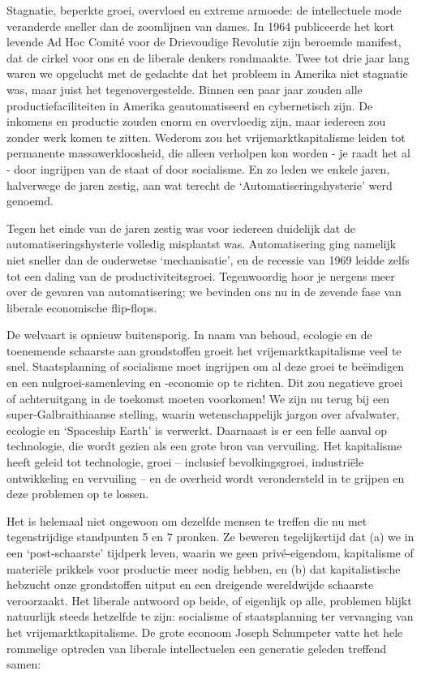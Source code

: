 \documentclass[
  a5paper,
  smalldemyvopaper,10pt,twoside,onecolumn,openright,extrafontsizes,hidelinks]{memoir}
\begin{document}
Stagnatie, beperkte groei, overvloed en extreme armoede: de
intellectuele mode veranderde sneller dan de zoomlijnen van dames. In
1964 publiceerde het kort levende Ad Hoc Comité voor de Drievoudige
Revolutie zijn beroemde manifest, dat de cirkel voor ons en de liberale
denkers rondmaakte. Twee tot drie jaar lang waren we opgelucht met de
gedachte dat het probleem in Amerika niet stagnatie was, maar juist het
tegenovergestelde. Binnen een paar jaar zouden alle
productiefaciliteiten in Amerika geautomatiseerd en cybernetisch zijn.
De inkomens en productie zouden enorm en overvloedig zijn, maar iedereen
zou zonder werk komen te zitten. Wederom zou het vrijemarktkapitalisme
leiden tot permanente massawerkloosheid, die alleen verholpen kon worden
- je raadt het al - door ingrijpen van de staat of door socialisme. En
zo leden we enkele jaren, halverwege de jaren zestig, aan wat terecht de
`Automatiseringshysterie' werd genoemd.

Tegen het einde van de jaren zestig was voor iedereen duidelijk dat de
automatiseringshysterie volledig misplaatst was. Automatisering ging
namelijk niet sneller dan de ouderwetse `mechanisatie', en de recessie
van 1969 leidde zelfs tot een daling van de productiviteitsgroei.
Tegenwoordig hoor je nergens meer over de gevaren van automatisering; we
bevinden ons nu in de zevende fase van liberale economische flip-flops.

De welvaart is opnieuw buitensporig. In naam van behoud, ecologie en de
toenemende schaarste aan grondstoffen groeit het vrijemarktkapitalisme
veel te snel. Staatsplanning of socialisme moet ingrijpen om al deze
groei te beëindigen en een nulgroei-samenleving en -economie op te
richten. Dit zou negatieve groei of achteruitgang in de toekomst moeten
voorkomen! We zijn nu terug bij een super-Galbraithiaanse stelling,
waarin wetenschappelijk jargon over afvalwater, ecologie en `Spaceship
Earth' is verwerkt. Daarnaast is er een felle aanval op technologie, die
wordt gezien als een grote bron van vervuiling. Het kapitalisme heeft
geleid tot technologie, groei -- inclusief bevolkingsgroei, industriële
ontwikkeling en vervuiling -- en de overheid wordt verondersteld in te
grijpen en deze problemen op te lossen.

Het is helemaal niet ongewoon om dezelfde mensen te treffen die nu met
tegenstrijdige standpunten 5 en 7 pronken. Ze beweren tegelijkertijd dat
(a) we in een `post-schaarste' tijdperk leven, waarin we geen
privé-eigendom, kapitalisme of materiële prikkels voor productie meer
nodig hebben, en (b) dat kapitalistische hebzucht onze grondstoffen
uitput en een dreigende wereldwijde schaarste veroorzaakt. Het liberale
antwoord op beide, of eigenlijk op alle, problemen blijkt natuurlijk
steeds hetzelfde te zijn: socialisme of staatsplanning ter vervanging
van het vrijemarktkapitalisme. De grote econoom Joseph Schumpeter vatte
het hele rommelige optreden van liberale intellectuelen een generatie
geleden treffend samen:
\end{document}
